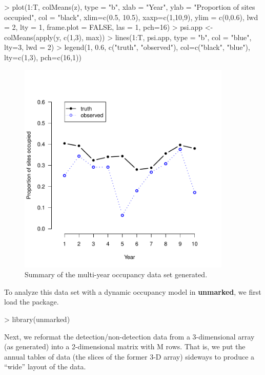 \documentclass[12pt]{article}
\renewenvironment{Schunk}{\vspace{\topsep}}{\vspace{\topsep}}
\begin{document}
\begin{small}
\begin{Schunk}
\begin{Sinput}
> plot(1:T, colMeans(z), type = "b", xlab = "Year",
      ylab = "Proportion of sites occupied",
      col = "black", xlim=c(0.5, 10.5), xaxp=c(1,10,9),
      ylim = c(0,0.6), lwd = 2, lty = 1,
      frame.plot = FALSE, las = 1, pch=16)
> psi.app <- colMeans(apply(y, c(1,3), max))
> lines(1:T, psi.app, type = "b", col = "blue", lty=3, lwd = 2)
> legend(1, 0.6, c("truth", "observed"),
        col=c("black", "blue"), lty=c(1,3), pch=c(16,1))
\end{Sinput}
\end{Schunk}
\end{small}


\begin{figure}[!h]
\centering
\includegraphics[width=4in,height=4in]{colext-sim.pdf}
\caption{Summary of the multi-year occupancy data set generated.}
\label{fig:sim}
\end{figure}


To analyze this data set with a dynamic occupancy model in
\textbf{unmarked}, we first load the package.

\begin{Schunk}
\begin{Sinput}
> library(unmarked)
\end{Sinput}
\end{Schunk}

Next, we reformat the detection/non-detection data from a 3-dimensional
array (as generated) into a 2-dimensional matrix with M rows.
That is, we put the annual tables of data (the slices of the former
3-D array) sideways to produce a ``wide'' layout of the data.
\end{document}

